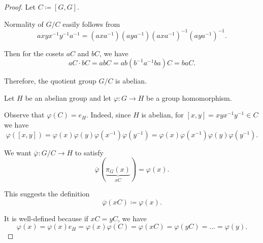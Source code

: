 \begin{proof}
  Let \( C \coloneqq [G, G] \).

   Normality of \( G / C \) easily follows from
  \begin{equation*}
    a xyx^{-1}y^{-1} a^{-1}
    =
    (a x a^{-1}) (a y a^{-1}) (a x a^{-1})^{-1} (a y a^{-1})^{-1}.
  \end{equation*}

  Then for the cosets \( a C \) and \( b C \), we have
  \begin{equation*}
    a C \cdot b C
    =
    a b C
    =
    a b (b^{-1} a^{-1} b a) C
    =
    b a C.
  \end{equation*}

  Therefore, the quotient group \( G / C \) is abelian.

   Let \( H \) be an abelian group and let \( \varphi: G \to H \) be a group homomorphism.

  Observe that \( \varphi(C) = e_H \). Indeed, since \( H \) is abelian, for \( [x, y] = xyx^{-1}y^{-1} \in C \) we have
  \begin{equation*}
    \varphi([x, y]) = \varphi(x) \varphi(y) \varphi(x^{-1}) \varphi(y^{-1}) = \varphi(x) \varphi(x^{-1}) \varphi(y) \varphi(y^{-1}).
  \end{equation*}

  We want \( \overline{\varphi}: G / C \to H \) to satisfy
  \begin{equation*}
    \overline{\varphi}(\underbrace{\pi_G(x)}_{xC}) = \varphi(x).
  \end{equation*}

  This suggests the definition
  \begin{equation*}
    \overline{\varphi}(xC) \coloneqq \varphi(x).
  \end{equation*}

  It is well-defined because if \( xC = yC \), we have
  \begin{equation*}
    \varphi(x)
    =
    \varphi(x) e_H
    =
    \varphi(x) \varphi(C)
    =
    \varphi(x C)
    =
    \varphi(y C)
    =
    \ldots
    =
    \varphi(y).
  \end{equation*}
\end{proof}
